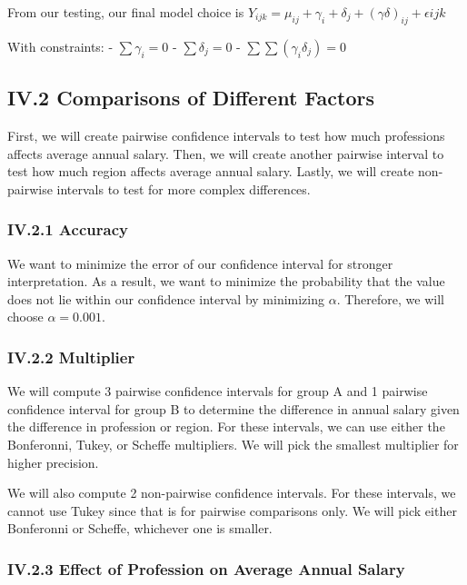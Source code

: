 \documentclass[
]{article}
\begin{document}
From our testing, our final model choice is
\(Y_{ijk} = \mu_{ij} + \gamma_i + \delta_j + (\gamma \delta)_{ij} + \epsilon{ijk}\)

With constraints: - \(\sum \gamma_i = 0\) - \(\sum \delta_j = 0\) -
\(\sum \sum (\gamma_i \delta_j) = 0\)

\subsection{IV.2 Comparisons of Different
Factors}\label{iv.2-comparisons-of-different-factors}

First, we will create pairwise confidence intervals to test how much
professions affects average annual salary. Then, we will create another
pairwise interval to test how much region affects average annual salary.
Lastly, we will create non-pairwise intervals to test for more complex
differences.

\subsubsection{IV.2.1 Accuracy}\label{iv.2.1-accuracy}

We want to minimize the error of our confidence interval for stronger
interpretation. As a result, we want to minimize the probability that
the value does not lie within our confidence interval by minimizing
\(\alpha\). Therefore, we will choose \(\alpha = 0.001\).

\subsubsection{IV.2.2 Multiplier}\label{iv.2.2-multiplier}

We will compute 3 pairwise confidence intervals for group A and 1
pairwise confidence interval for group B to determine the difference in
annual salary given the difference in profession or region. For these
intervals, we can use either the Bonferonni, Tukey, or Scheffe
multipliers. We will pick the smallest multiplier for higher precision.

We will also compute 2 non-pairwise confidence intervals. For these
intervals, we cannot use Tukey since that is for pairwise comparisons
only. We will pick either Bonferonni or Scheffe, whichever one is
smaller.

\subsubsection{IV.2.3 Effect of Profession on Average Annual
Salary}\label{iv.2.3-effect-of-profession-on-average-annual-salary}
\end{document}
